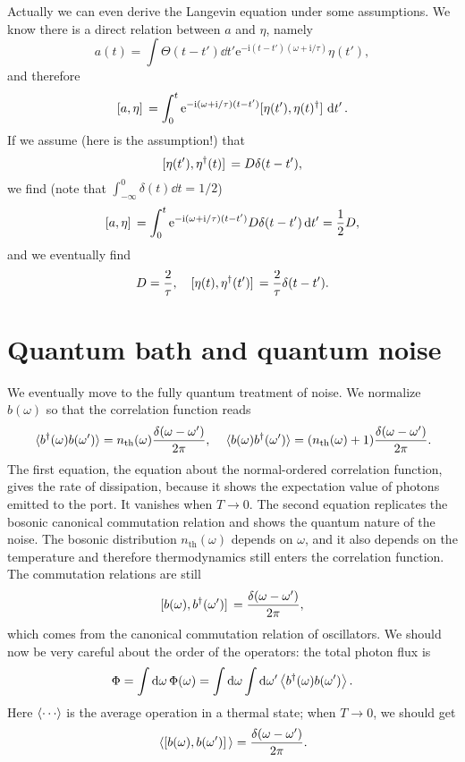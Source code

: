 \documentclass[hyperref, a4paper]{article}
\newcommand*{\ii}{\mathrm{i}}
\newcommand*{\ee}{\mathrm{e}}
\newcommand*{\nth}{n_{\text{th}}}
\begin{document}
Actually we can even derive the Langevin equation under some assumptions.
We know there is a direct relation between $a$ and $\eta$, namely 
\begin{equation}
    a(t) = \int \Theta(t - t') \dd{t'} \ee^{- \ii (t - t') (\omega + \ii / \tau)} \eta(t'),
\end{equation}
and therefore 
\begin{equation}
    \comm*{a}{\eta} = \int_{0}^{t} \ee^{- \ii (\omega + \ii / \tau) (t - t')} \comm*{\eta(t')}{\eta(t)^\dag} \dd{t'}.
\end{equation}
If we assume (here is the assumption!) that 
\begin{equation}
    \comm*{\eta(t')}{\eta^\dag(t)} = D \delta(t - t'),
\end{equation}
we find (note that $\int_{-\infty}^{0} \delta(t) \dd{t} = 1/2$)
\[
    \comm*{a}{\eta} = \int_{0}^{t} \ee^{- \ii (\omega + \ii / \tau) (t - t')} D \delta(t - t') \dd{t'}
    = \frac{1}{2} D,
\]
and we eventually find 
\begin{equation}
    D = \frac{2}{\tau}, \quad 
    \comm*{\eta(t)}{\eta^\dag(t')} = \frac{2}{\tau} \delta(t - t').
\end{equation}

\section{Quantum bath and quantum noise}

We eventually move to the fully quantum treatment of noise.
We normalize $b(\omega)$ so that the correlation function reads 
\begin{equation}
    \expval*{b^\dag(\omega) b(\omega')} = \nth(\omega) \frac{\delta(\omega - \omega')}{2\pi}, \quad 
    \expval*{b(\omega) b^\dag(\omega')} = (\nth(\omega) + 1) \frac{\delta(\omega - \omega')}{2\pi}.
\end{equation} 
The first equation, the equation about the normal-ordered correlation function,
gives the rate of dissipation, because it shows the expectation value of 
photons emitted to the port.
It vanishes when $T \to 0$.
The second equation replicates the bosonic canonical commutation relation 
and shows the quantum nature of the noise.
The bosonic distribution $\nth(\omega)$ depends on $\omega$,
and it also depends on the temperature and therefore thermodynamics still enters the correlation function.
The commutation relations are still 
\begin{equation}
    \comm*{b(\omega)}{b^\dag(\omega')} = \frac{\delta(\omega - \omega')}{2\pi},
\end{equation}
which comes from the canonical commutation relation of oscillators.
We should now be very careful about the order of the operators:
the total photon flux is 
\begin{equation}
    \Phi = \int \dd{\omega} \Phi(\omega) = \int \dd{\omega} \int \dd{\omega'} \expval{b^\dag(\omega) b(\omega')}.
\end{equation}
Here $\expval{\cdots}$ is the average operation in a thermal state; when $T \to 0$, we should get 
\begin{equation}
    \expval*{\comm*{b(\omega)}{b(\omega')}} = \frac{\delta(\omega - \omega')}{2\pi}.
\end{equation}
\end{document}
